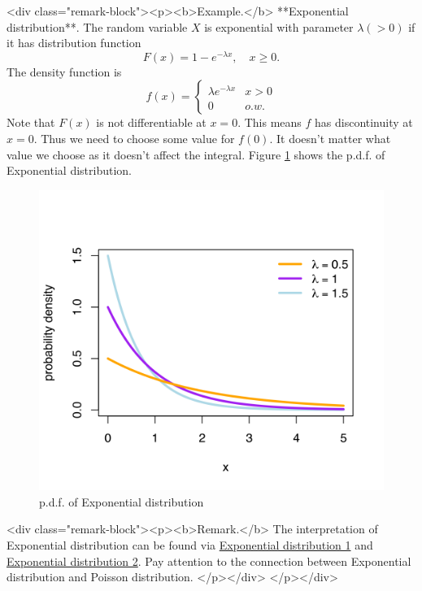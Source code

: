 <div class="remark-block"><p><b>Example.</b> 
**Exponential distribution**. The random variable $X$ is exponential with parameter $\lambda(> 0)$ if it has distribution function 
$$\begin{equation}
    F(x) = 1 - e^{-\lambda x}, \quad x \geq 0.
\end{equation}$$
The density function is
$$\begin{equation}
    f(x) = \begin{cases} \lambda e^{-\lambda x} & x > 0 \\ 0 & o.w.
    \end{cases}
\end{equation}$$
Note that $F(x)$ is not differentiable at $x=0$. This means $f$ has discontinuity at $x=0$. Thus we need to choose some value for $f(0)$. It doesn't matter what value we choose as it doesn't affect the integral. Figure \ref{fig:exponential} shows the p.d.f. of Exponential distribution.
\begin{figure}[!htb]
    \centering
    \includegraphics[scale=0.25]{plots/exponential.png}
    \caption{p.d.f. of Exponential distribution}
    \label{fig:exponential}
\end{figure}

<div class="remark-block"><p><b>Remark.</b> 
The interpretation of Exponential distribution can be found via \href{https://www.probabilitycourse.com/chapter4/4_2_2_exponential.php}{Exponential distribution 1} and \href{https://www.statlect.com/probability-distributions/exponential-distribution}{Exponential distribution 2}. Pay attention to the connection between Exponential distribution and Poisson distribution.
</p></div>
</p></div>


